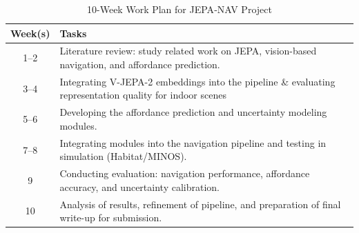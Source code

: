\documentclass{article}
\begin{document}
\begin{table}[htbp]
\centering
\begin{tabular}{|c|l|}
\hline
\textbf{Week(s)} & \textbf{Tasks} \\ \hline
1--2 & Literature review: study related work on JEPA, vision-based navigation, and affordance prediction. \\ \hline
3--4 & Integrating V-JEPA-2 embeddings into the pipeline \& evaluating representation quality for indoor scenes \\ \hline
5--6 & Developing the affordance prediction and uncertainty modeling modules. \\ \hline
7--8 & Integrating modules into the navigation pipeline and testing in simulation (Habitat/MINOS). \\ \hline
9 & Conducting evaluation: navigation performance, affordance accuracy, and uncertainty calibration. \\ \hline
10 & Analysis of results, refinement of pipeline, and preparation of final write-up for submission. \\ \hline
\end{tabular}
\caption{10-Week Work Plan for JEPA‑NAV Project}
\label{tab:workplan}
\end{table}

\end{document}
